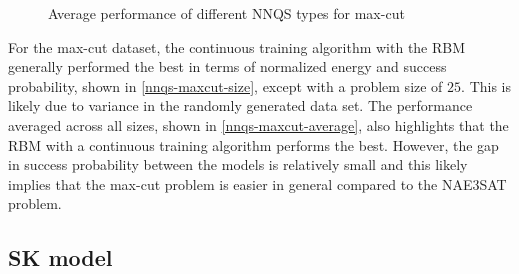 \begin{figure}[!htbp]
    \hfill
    \caption{Average performance of different NNQS types for max-cut}
    \label{nnqs-maxcut-average}
\end{figure}

For the max-cut dataset, the continuous training algorithm with the RBM generally performed the best in terms of normalized energy and success probability, shown in \autoref{nnqs-maxcut-size}, except with a problem size of $25$. This is likely due to variance in the randomly generated data set. The performance averaged across all sizes, shown in \autoref{nnqs-maxcut-average}, also highlights that the RBM with a continuous training algorithm performs the best. However, the gap in success probability between the models is relatively small and this likely implies that the max-cut problem is easier in general compared to the NAE3SAT problem.


\subsection{SK model}

